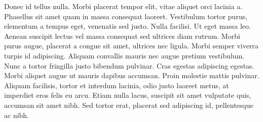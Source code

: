 \documentclass{article}
\begin{document}
Donec id tellus nulla. Morbi placerat tempor elit, vitae aliquet orci lacinia a. Phasellus sit amet quam in massa consequat laoreet. Vestibulum tortor purus, elementum a tempus eget, venenatis sed justo. Nulla facilisi. Ut eget massa leo. Aenean suscipit lectus vel massa consequat sed ultrices diam rutrum. Morbi purus augue, placerat a congue sit amet, ultrices nec ligula. Morbi semper viverra turpis id adipiscing. Aliquam convallis mauris nec augue pretium vestibulum. Nunc a tortor fringilla justo bibendum pulvinar. Cras egestas adipiscing egestas. Morbi aliquet augue ut mauris dapibus accumsan. Proin molestie mattis pulvinar. Aliquam facilisis, tortor et interdum lacinia, odio justo laoreet metus, at imperdiet eros felis eu arcu. Etiam nulla lacus, suscipit sit amet vulputate quis, accumsan sit amet nibh. Sed tortor erat, placerat sed adipiscing id, pellentesque ac nibh.
\end{document}
